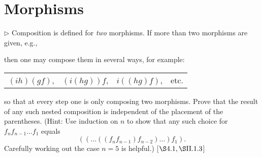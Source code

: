 \section{Morphisms}
\extitle

\begin{exercise}
	\(\triangleright\) Composition is defined for \textit{two} morphisms. If more than two morphisms are given, e.g., \vspace*{-0.4em}
	\begin{center}
	\end{center}
	then one may compose them in several ways, for example:
	\begin{center}
		\begin{tabular}{c c c c}
			\((ih)(gf)\), & \((i(hg))f\), & \(i((hg)f)\), & etc.
		\end{tabular}
	\end{center}
	so that at every step one is only composing two morphisms. Prove that the result of any such nested composition is independent of the placement of the parentheses. (Hint: Use induction on \(n\) to show that any such choice for \(f_n f_{n-1} \dots f_1\) equals
	\begin{equation*}
		((\dots ((f_n f_{n-1}) f_{n-2}) \dots )f_1).
	\end{equation*}
	Carefully working out the case \(n = 5\) is helpful.) [\(\S 4.1, \S \RNo{2}.1.3\)]
\end{exercise}
